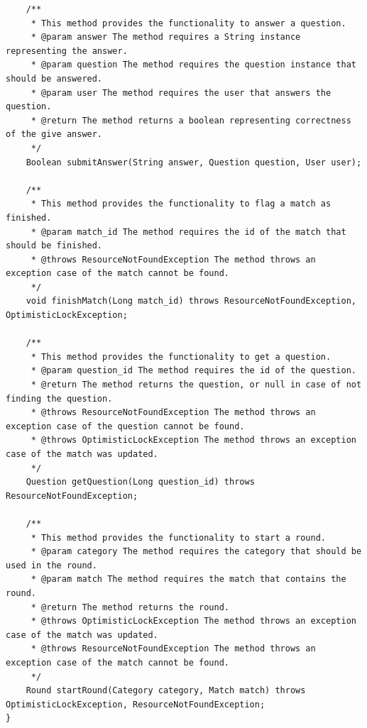 \begin{lstlisting}
    /**
     * This method provides the functionality to answer a question.
     * @param answer The method requires a String instance representing the answer.
     * @param question The method requires the question instance that should be answered.
     * @param user The method requires the user that answers the question.
     * @return The method returns a boolean representing correctness of the give answer.
     */
    Boolean submitAnswer(String answer, Question question, User user);

    /**
     * This method provides the functionality to flag a match as finished.
     * @param match_id The method requires the id of the match that should be finished.
     * @throws ResourceNotFoundException The method throws an exception case of the match cannot be found.
     */
    void finishMatch(Long match_id) throws ResourceNotFoundException, OptimisticLockException;

    /**
     * This method provides the functionality to get a question.
     * @param question_id The method requires the id of the question.
     * @return The method returns the question, or null in case of not finding the question.
     * @throws ResourceNotFoundException The method throws an exception case of the question cannot be found.
     * @throws OptimisticLockException The method throws an exception case of the match was updated.
     */
    Question getQuestion(Long question_id) throws ResourceNotFoundException;

    /**
     * This method provides the functionality to start a round.
     * @param category The method requires the category that should be used in the round.
     * @param match The method requires the match that contains the round.
     * @return The method returns the round.
     * @throws OptimisticLockException The method throws an exception case of the match was updated.
     * @throws ResourceNotFoundException The method throws an exception case of the match cannot be found.
     */
    Round startRound(Category category, Match match) throws OptimisticLockException, ResourceNotFoundException;
}
\end{lstlisting}
\clearpage
